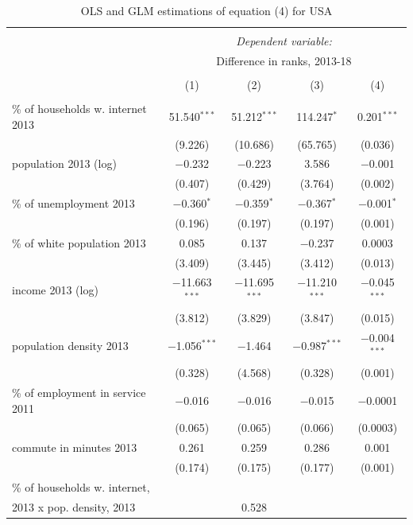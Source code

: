 \documentclass[10pt,letterpaper]{article}
\begin{document}
\begin{table}[!htbp] \centering 
  \caption{OLS and GLM estimations of equation (4) for USA\label{ols.usa}} 
  \label{} 
\small 
\begin{tabular}{@{\extracolsep{1pt}}lcccc} 
\\[-1.8ex]\hline 
\hline \\[-1.8ex] 
 & \multicolumn{4}{c}{\textit{Dependent variable:}} \\ 
\cline{2-5} 
 & \multicolumn{4}{c}{Difference in ranks, 2013-18} \\ 
\\[-1.8ex] & (1) & (2) & (3) & (4)\\ 
\hline \\[-1.8ex] 
 \% of households w. internet 2013 & 51.540$^{***}$ & 51.212$^{***}$ & 114.247$^{*}$ & 0.201$^{***}$ \\ 
  & (9.226) & (10.686) & (65.765) & (0.036) \\ 
  population 2013 (log) & $-$0.232 & $-$0.223 & 3.586 & $-$0.001 \\ 
  & (0.407) & (0.429) & (3.764) & (0.002) \\ 
  \% of unemployment 2013 & $-$0.360$^{*}$ & $-$0.359$^{*}$ & $-$0.367$^{*}$ & $-$0.001$^{*}$ \\ 
  & (0.196) & (0.197) & (0.197) & (0.001) \\ 
  \% of white population 2013 & 0.085 & 0.137 & $-$0.237 & 0.0003 \\ 
  & (3.409) & (3.445) & (3.412) & (0.013) \\ 
  income 2013 (log) & $-$11.663$^{***}$ & $-$11.695$^{***}$ & $-$11.210$^{***}$ & $-$0.045$^{***}$ \\ 
  & (3.812) & (3.829) & (3.847) & (0.015) \\ 
  population density 2013 & $-$1.056$^{***}$ & $-$1.464 & $-$0.987$^{***}$ & $-$0.004$^{***}$ \\ 
  & (0.328) & (4.568) & (0.328) & (0.001) \\ 
  \% of employment in service 2011 & $-$0.016 & $-$0.016 & $-$0.015 & $-$0.0001 \\ 
  & (0.065) & (0.065) & (0.066) & (0.0003) \\ 
  commute in minutes 2013 & 0.261 & 0.259 & 0.286 & 0.001 \\ 
  & (0.174) & (0.175) & (0.177) & (0.001) \\ 
  \% of households w. internet, \\
                             2013 x pop. density, 2013 &  & 0.528 &  &  \\ 

\end{tabular}
\end{table}
\end{document}
